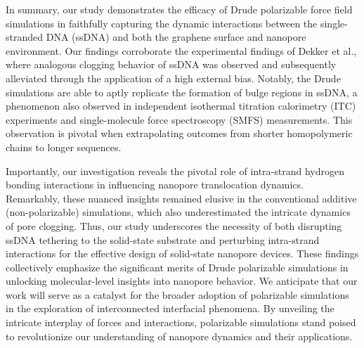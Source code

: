 In summary, our study demonstrates the efficacy of Drude polarizable force field simulations in faithfully capturing the dynamic interactions between the single-stranded DNA (ssDNA) and both the graphene surface and nanopore environment. Our findings corroborate the experimental findings of Dekker et al., where analogous clogging behavior of ssDNA was observed and subsequently alleviated through the application of a high external bias.\supercite{schneider_tailoring_2013}  Notably, the Drude simulations are able to aptly replicate the formation of bulge regions in ssDNA, a phenomenon also observed in independent isothermal titration calorimetry (ITC) experiments\supercite{ranganathan_complex_2016} and single-molecule force spectroscopy (SMFS) measurements.\supercite{manohar_peeling_2008, iliafar_quantifying_2012,hughes_adsorption_2017} This observation is pivotal when extrapolating outcomes from shorter homopolymeric chains to longer sequences.

Importantly, our investigation reveals the pivotal role of intra-strand hydrogen bonding interactions in influencing nanopore translocation dynamics. Remarkably, these nuanced insights remained elusive in the  conventional additive (non-polarizable) simulations, which also underestimated the intricate dynamics of pore clogging. Thus, our study underscores the necessity of both disrupting ssDNA tethering to the solid-state substrate and perturbing intra-strand interactions for the effective design of solid-state nanopore devices. These findings collectively emphasize the significant merits of Drude polarizable simulations in unlocking molecular-level insights into nanopore behavior. We anticipate that our work will serve as a catalyst for the broader adoption of polarizable simulations in the exploration of interconnected interfacial phenomena. By unveiling the intricate interplay of forces and interactions, polarizable simulations stand poised to revolutionize our understanding of nanopore dynamics and their applications.